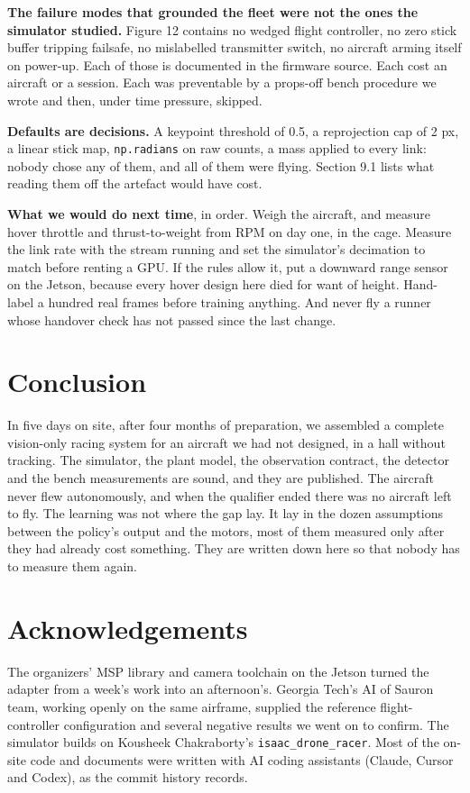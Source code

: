 \documentclass{article}
\begin{document}
\textbf{The failure modes that grounded the fleet were not the ones the simulator studied.} Figure 12 contains no wedged flight controller, no zero stick buffer tripping failsafe, no mislabelled transmitter switch, no aircraft arming itself on power-up. Each of those is documented in the firmware source. Each cost an aircraft or a session. Each was preventable by a props-off bench procedure we wrote and then, under time pressure, skipped.

\textbf{Defaults are decisions.} A keypoint threshold of 0.5, a reprojection cap of 2 px, a linear stick map, \texttt{np.radians} on raw counts, a mass applied to every link: nobody chose any of them, and all of them were flying. Section 9.1 lists what reading them off the artefact would have cost.

\textbf{What we would do next time}, in order. Weigh the aircraft, and measure hover throttle and thrust-to-weight from RPM on day one, in the cage. Measure the link rate with the stream running and set the simulator's decimation to match before renting a GPU. If the rules allow it, put a downward range sensor on the Jetson, because every hover design here died for want of height. Hand-label a hundred real frames before training anything. And never fly a runner whose handover check has not passed since the last change.

\section{Conclusion}
In five days on site, after four months of preparation, we assembled a complete vision-only racing system for an aircraft we had not designed, in a hall without tracking. The simulator, the plant model, the observation contract, the detector and the bench measurements are sound, and they are published. The aircraft never flew autonomously, and when the qualifier ended there was no aircraft left to fly. The learning was not where the gap lay. It lay in the dozen assumptions between the policy's output and the motors, most of them measured only after they had already cost something. They are written down here so that nobody has to measure them again.

\section*{Acknowledgements}
The organizers' MSP library and camera toolchain on the Jetson turned the adapter from a week's work into an afternoon's. Georgia Tech's AI of Sauron team, working openly on the same airframe, supplied the reference flight-controller configuration and several negative results we went on to confirm. The simulator builds on Kousheek Chakraborty's \texttt{isaac\_drone\_racer}. Most of the on-site code and documents were written with AI coding assistants (Claude, Cursor and Codex), as the commit history records.
\end{document}
